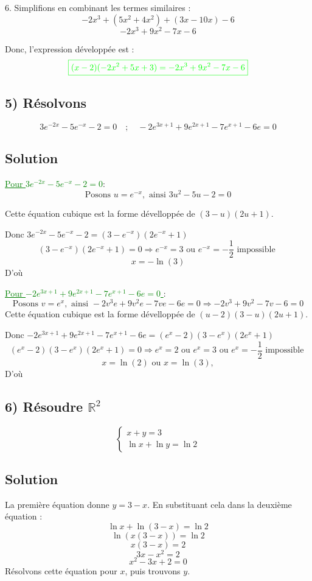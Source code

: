 \documentclass[12pt]{article}
\begin{document}
6. Simplifions en combinant les termes similaires :
\[
-2x^3 + (5x^2 + 4x^2) + (3x - 10x) - 6
\]
\[
-2x^3 + 9x^2 - 7x - 6
\]

Donc, l'expression développée est :
\[\textcolor{green}{\boxed{
(x-2)(-2x^2 + 5x + 3) = -2x^3 + 9x^2 - 7x - 6
}}\]

\subsection*{5) Résolvons } 
\[
3e^{-2x}-5e^{-x}-2=0 \quad ; \quad -2e^{3x+1}+9e^{2x+1}-7e^{x+1}-6e=0
\]

\subsection*{Solution}
\textcolor{green}{\underline{Pour \(3e^{-2x}-5e^{-x}-2=0\)}}:
\[
\text{Posons } u = e^{-x}, \text{ ainsi } 3u^2 - 5u - 2 = 0
\]

Cette équation cubique est la forme dévelloppée de $(3-u)(2u+1)$.

Donc $3e^{-2x}-5e^{-x}-2=(3-e^{-x})(2e^{-x}+1)$
\[
(3-e^{-x})(2e^{-x}+1)= 0 \Longrightarrow e^{-x}=3 \text{ ou } e^{-x}=-\frac{1}{2} \text{ impossible }
\]
\[
x=-\ln(3)
\]
D'où \textcolor{green}{}

\textcolor{green}{\underline{Pour \(-2e^{3x+1}+9e^{2x+1}-7e^{x+1}-6e=0\) }}:
\[
\text{Posons } v = e^{x}, \text{ ainsi } -2v^3e + 9v^2e - 7ve - 6e = 0 \Longrightarrow -2v^3 + 9v^2 - 7v - 6 = 0
\]
Cette équation cubique est la forme dévelloppée de $(u-2)(3-u)(2u+1)$.

Donc $-2e^{3x+1}+9e^{2x+1}-7e^{x+1}-6e=(e^{x}-2)(3-e^{x})(2e^{x}+1)$
\[
(e^{x}-2)(3-e^{x})(2e^{x}+1)= 0 \Longrightarrow e^{x}=2 \text{ ou } e^{x}=3 \text{ ou } e^{x}=-\frac{1}{2} \text{ impossible }
\]
\[
x=\ln(2) \text{ ou }x=\ln(3), 
\]
D'où \textcolor{green}{}

\subsection*{6) Résoudre $\mathbb{R}^{2}$ } 
\[
\begin{cases}
x + y = 3 \\
\ln x + \ln y = \ln 2
\end{cases}
\]

\subsection*{Solution}
La première équation donne \( y = 3 - x \). En substituant cela dans la deuxième équation :
\[
\ln x + \ln (3 - x) = \ln 2
\]
\[
\ln (x(3 - x)) = \ln 2
\]
\[
x(3 - x) = 2
\]
\[
3x - x^2 = 2
\]
\[
x^2 - 3x + 2 = 0
\]
Résolvons cette équation pour \(x\), puis trouvons \(y\).
\end{document}
